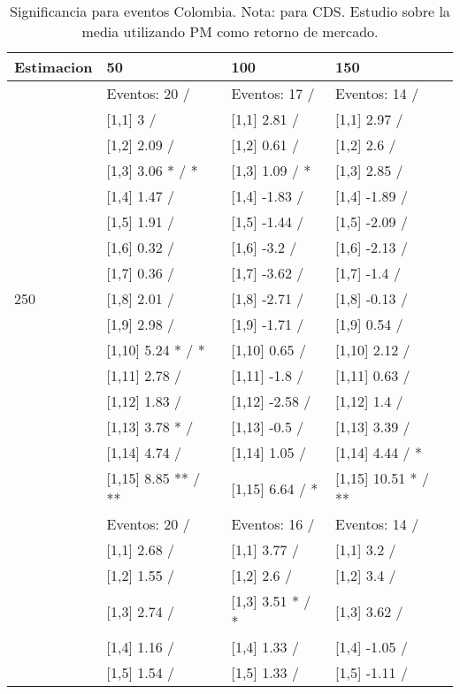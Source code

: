 \begin{table}

\caption{Significancia para eventos Colombia. Nota: para CDS. Estudio sobre la media utilizando PM como retorno de mercado.}
\centering
\begin{tabular}[t]{llll}
\toprule
Estimacion & 50 & 100 & 150\\
\midrule
 & Eventos:  20 / & Eventos:  17 / & Eventos:  14 /\\
 & {}[1,1] 3  / & {}[1,1] 2.81  / & {}[1,1] 2.97  /\\
 & {}[1,2] 2.09  / & {}[1,2] 0.61  / & {}[1,2] 2.6  /\\
 & {}[1,3] 3.06 * / * & {}[1,3] 1.09  / * & {}[1,3] 2.85  /\\
 & {}[1,4] 1.47  / & {}[1,4] -1.83  / & {}[1,4] -1.89  /\\
\addlinespace
 & {}[1,5] 1.91  / & {}[1,5] -1.44  / & {}[1,5] -2.09  /\\
 & {}[1,6] 0.32  / & {}[1,6] -3.2  / & {}[1,6] -2.13  /\\
 & {}[1,7] 0.36  / & {}[1,7] -3.62  / & {}[1,7] -1.4  /\\
250 & {}[1,8] 2.01  / & {}[1,8] -2.71  / & {}[1,8] -0.13  /\\
 & {}[1,9] 2.98  / & {}[1,9] -1.71  / & {}[1,9] 0.54  /\\
\addlinespace
 & {}[1,10] 5.24 * / * & {}[1,10] 0.65  / & {}[1,10] 2.12  /\\
 & {}[1,11] 2.78  / & {}[1,11] -1.8  / & {}[1,11] 0.63  /\\
 & {}[1,12] 1.83  / & {}[1,12] -2.58  / & {}[1,12] 1.4  /\\
 & {}[1,13] 3.78 * / & {}[1,13] -0.5  / & {}[1,13] 3.39  /\\
 & {}[1,14] 4.74  / & {}[1,14] 1.05  / & {}[1,14] 4.44  / *\\
\addlinespace
 & {}[1,15] 8.85 ** / ** & {}[1,15] 6.64  / * & {}[1,15] 10.51 * / **\\
 & Eventos:  20 / & Eventos:  16 / & Eventos:  14 /\\
 & {}[1,1] 2.68  / & {}[1,1] 3.77  / & {}[1,1] 3.2  /\\
 & {}[1,2] 1.55  / & {}[1,2] 2.6  / & {}[1,2] 3.4  /\\
 & {}[1,3] 2.74  / & {}[1,3] 3.51 * / * & {}[1,3] 3.62  /\\
\addlinespace
 & {}[1,4] 1.16  / & {}[1,4] 1.33  / & {}[1,4] -1.05  /\\
 & {}[1,5] 1.54  / & {}[1,5] 1.33  / & {}[1,5] -1.11  /\\

\end{tabular}
\end{table}
